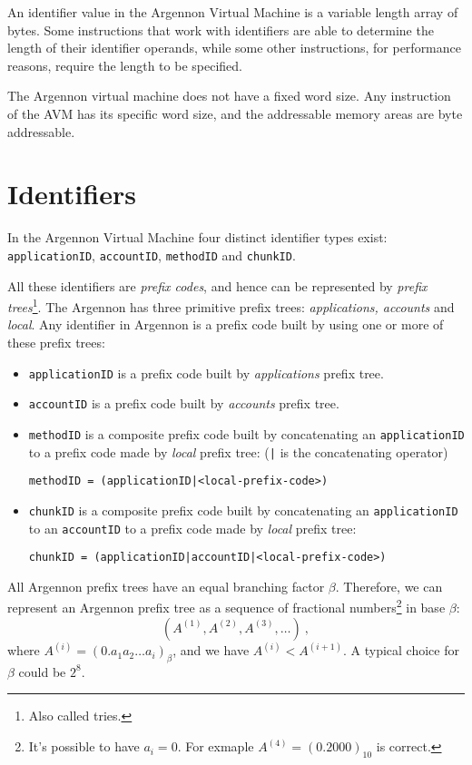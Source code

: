 An identifier value in the Argennon Virtual Machine is a variable length array of bytes. Some instructions
that work with identifiers are able to determine the length of their identifier operands, while some
other instructions, for performance reasons, require the length to be specified.

The Argennon virtual machine does not have a fixed word size. Any instruction of the AVM has
its specific word size, and the addressable memory areas are byte addressable.


\section{Identifiers}\label{sec:identifiers}

In the Argennon Virtual Machine four distinct identifier types exist: \texttt{applicationID}, \texttt{accountID},
\texttt{methodID} and \texttt{chunkID}.

All these identifiers are \emph{prefix codes}, and hence can be represented by
\emph{prefix trees}\footnote{Also called tries.}. The Argennon has three primitive prefix trees:
\emph{applications, accounts} and \emph{local}. Any identifier in Argennon is a
prefix code built by using one or more of these prefix trees:
\begin{itemize}
    \item \texttt{applicationID} is a prefix code built by \emph{applications} prefix tree.
    \item \texttt{accountID} is a prefix code built by \emph{accounts} prefix tree.
    \item \texttt{methodID} is a composite prefix code built by concatenating an \texttt{applicationID} to
    a prefix code made by \emph{local} prefix tree: (\texttt{|} is the concatenating operator)

    \texttt{methodID = (applicationID|<local-prefix-code>)}
    \item \texttt{chunkID} is a composite prefix code built by concatenating an \texttt{applicationID} to
    an \texttt{accountID} to a prefix code made by \emph{local} prefix tree:

    \texttt{chunkID = (applicationID|accountID|<local-prefix-code>)}
\end{itemize}

All Argennon prefix trees have an equal branching factor \(\beta\). Therefore, we can represent an Argennon
prefix tree as a sequence of fractional numbers\footnote{It's possible to have \(a_i=0\). For
exmaple \(A^{(4)}=(0.2000)_{10}\) is correct.} in base \(\beta\):
\[
    (A^{(1)},A^{(2)},A^{(3)},\dots)\ ,
\]
where \(A^{(i)}=(0.a_{1}a_{2}\dots a_{i})_\beta\), and we have \(A^{(i)}<A^{(i+1)}\). A typical choice for \(\beta\)
could be \(2^8\).

